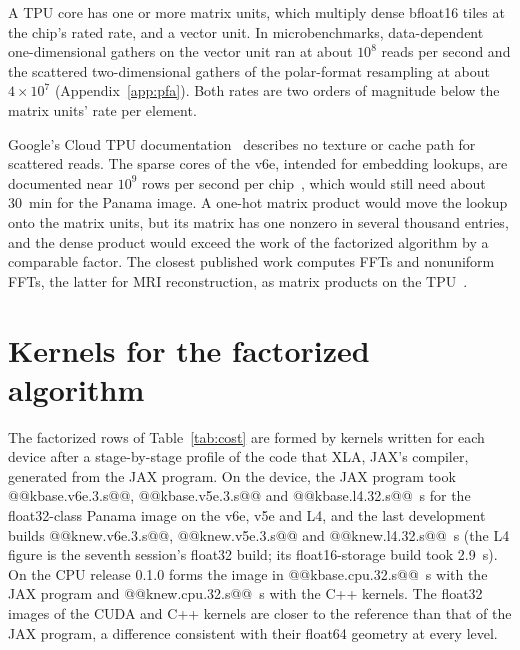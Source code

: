 \documentclass[11pt]{article}
\begin{document}
A TPU core has one or more matrix units, which multiply dense bfloat16 tiles at the chip's rated rate, and a vector unit. In microbenchmarks, data-dependent one-dimensional gathers on the vector unit ran at about $10^8$ reads per second and the scattered two-dimensional gathers of the polar-format resampling at about $4 \times 10^7$ (Appendix~\ref{app:pfa}). Both rates are two orders of magnitude below the matrix units' rate per element.

Google's Cloud TPU documentation~\cite{tpudocs} describes no texture or cache path for scattered reads. The sparse cores of the v6e, intended for embedding lookups, are documented near $10^9$ rows per second per chip~\cite{tpuv6e}, which would still need about 30~min for the Panama image. A one-hot matrix product would move the lookup onto the matrix units, but its matrix has one nonzero in several thousand entries, and the dense product would exceed the work of the factorized algorithm by a comparable factor. The closest published work computes FFTs and nonuniform FFTs, the latter for MRI reconstruction, as matrix products on the TPU~\cite{lu2020,lu2021}.

\section{Kernels for the factorized algorithm}
\label{app:kernels}



The factorized rows of Table~\ref{tab:cost} are formed by kernels written for each device after a stage-by-stage profile of the code that XLA, JAX's compiler, generated from the JAX program. On the device, the JAX program took @@kbase.v6e.3.s@@, @@kbase.v5e.3.s@@ and @@kbase.l4.32.s@@~s for the float32-class Panama image on the v6e, v5e and L4, and the last development builds @@knew.v6e.3.s@@, @@knew.v5e.3.s@@ and @@knew.l4.32.s@@~s (the L4 figure is the seventh session's float32 build; its float16-storage build took 2.9~s). On the CPU release 0.1.0 forms the image in @@kbase.cpu.32.s@@~s with the JAX program and @@knew.cpu.32.s@@~s with the C++ kernels. The float32 images of the CUDA and C++ kernels are closer to the reference than that of the JAX program, a difference consistent with their float64 geometry at every level.
\end{document}

